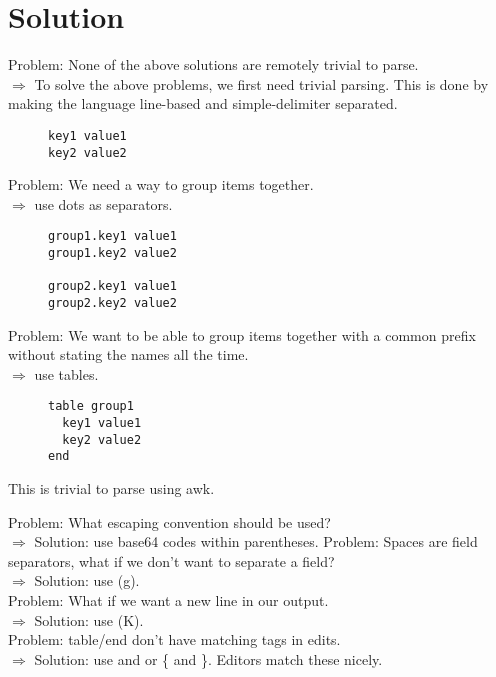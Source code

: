 \documentclass[listof=totoc]{article}
\begin{document}
\section{Solution}
\noindent Problem: None of the above solutions are remotely trivial to parse. \\
$\Rightarrow$ To solve the above problems, we first need trivial parsing. This is done by making the language line-based and simple-delimiter separated.


\begin{figure}[H]
\centering
\begin{varwidth}{\linewidth}
\begin{verbatim}
key1 value1
key2 value2
\end{verbatim}
\end{varwidth}
\caption{}
\end{figure}

\noindent Problem: We need a way to group items together. \\
$\Rightarrow$ use dots as separators.


\begin{figure}[H]
\centering
\begin{varwidth}{\linewidth}
\begin{verbatim}
group1.key1 value1
group1.key2 value2

group2.key1 value1
group2.key2 value2
\end{verbatim}
\end{varwidth}
\caption{}
\end{figure}

\noindent Problem: We want to be able to group items together with a common prefix without stating the names all the time. \\
$\Rightarrow$ use tables.


\begin{figure}[H]
\centering
\begin{varwidth}{\linewidth}
\begin{verbatim}
table group1
  key1 value1
  key2 value2
end
\end{verbatim}
\end{varwidth}
\caption{}
\end{figure}

\noindent This is trivial to parse using awk.

\noindent Problem: What escaping convention should be used? \\
$\Rightarrow$ Solution: use base64 codes within parentheses.
Problem: Spaces are field separators, what if we don't want to separate a field? \\
$\Rightarrow$ Solution: use (g). \\
Problem: What if we want a new line in our output. \\
$\Rightarrow$ Solution: use (K). \\
Problem: table/end don't have matching tags in edits. \\
$\Rightarrow$ Solution: use \lbrack and \rbrack or \{ and \}. Editors match these nicely.
\end{document}
